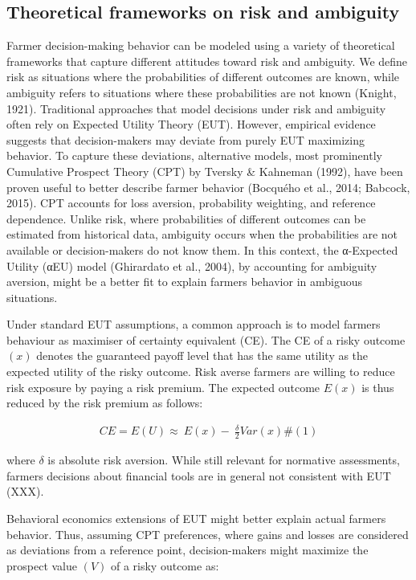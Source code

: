 \documentclass[
]{article}
\begin{document}
\subsection{Theoretical frameworks on risk and
ambiguity}\label{theoretical-frameworks-on-risk-and-ambiguity}

Farmer decision-making behavior can be modeled using a variety of
theoretical frameworks that capture different attitudes toward risk and
ambiguity. We define risk as situations where the probabilities of
different outcomes are known, while ambiguity refers to situations where
these probabilities are not known (Knight, 1921). Traditional approaches
that model decisions under risk and ambiguity often rely on Expected
Utility Theory (EUT). However, empirical evidence suggests that
decision-makers may deviate from purely EUT maximizing behavior. To
capture these deviations, alternative models, most prominently
Cumulative Prospect Theory (CPT) by Tversky \& Kahneman (1992), have
been proven useful to better describe farmer behavior (Bocquého et al.,
2014; Babcock, 2015). CPT accounts for loss aversion, probability
weighting, and reference dependence. Unlike risk, where probabilities of
different outcomes can be estimated from historical data, ambiguity
occurs when the probabilities are not available or decision-makers do
not know them. In this context, the α-Expected Utility (αEU) model
(Ghirardato et al., 2004), by accounting for ambiguity aversion, might
be a better fit to explain farmers\textquotesingle{} behavior in
ambiguous situations.

Under standard EUT assumptions, a common approach is to model
farmers\textquotesingle{} behaviour as maximiser of certainty equivalent
(CE). The CE of a risky outcome \((x)\) denotes the guaranteed payoff
level that has the same utility as the expected utility of the risky
outcome. Risk averse farmers are willing to reduce risk exposure by
paying a risk premium. The expected outcome \(E(x)\) is thus reduced by
the risk premium as follows:

\[\begin{array}{r}
{CE = E(U) \approx}{\ E(x) - \ \frac{\delta}{2}Var(x)}\#(1)
\end{array}\]

where \(\delta\) is absolute risk aversion. While still relevant for
normative assessments, farmers decisions about financial tools are in
general not consistent with EUT (XXX).

Behavioral economics extensions of EUT might better explain actual
farmers behavior. Thus, assuming CPT preferences, where gains and losses
are considered as deviations from a reference point, decision-makers
might maximize the prospect value \((V)\) of a risky outcome as:
\end{document}
